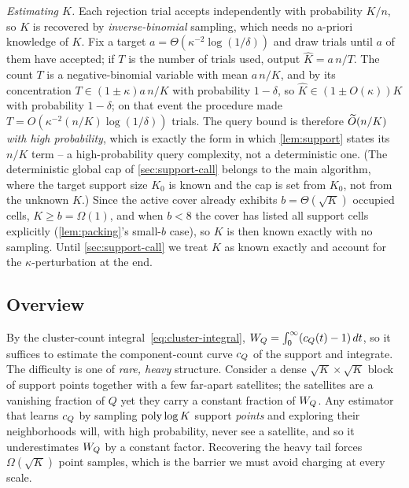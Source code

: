 \emph{Estimating $K$.} Each rejection trial accepts independently with probability $K/n$, so $K$ is
recovered by \emph{inverse-binomial} sampling, which needs no a-priori knowledge of $K$. Fix a target
$a=\Theta(\kappa^{-2}\log(1/\delta))$ and draw trials until $a$ of them have accepted; if $T$ is the number
of trials used, output $\widehat K=a\,n/T$. The count $T$ is a negative-binomial variable with mean
$a\,n/K$, and by its concentration $T\in(1\pm\kappa)a\,n/K$ with probability $1-\delta$, so $\widehat K\in
(1\pm O(\kappa))K$ with probability $1-\delta$; on that event the procedure made $T=O(\kappa^{-2}(n/K)
\log(1/\delta))$ trials. The query bound is therefore $\widetilde{O}(n/K)$ \emph{with high probability}, which is
exactly the form in which \cref{lem:support} states its $n/K$ term -- a high-probability query complexity,
not a deterministic one. (The deterministic global cap of \cref{sec:support-call} belongs to the main
algorithm, where the target support size $K_0$ is known and the cap is set from $K_0$, not from the unknown
$K$.) Since the active cover already exhibits $b=\Theta(\sqrt K)$ occupied cells, $K\ge b=\Omega(1)$, and
when $b<8$ the cover has listed all support cells explicitly (\cref{lem:packing}'s small-$b$ case), so $K$
is then known exactly with no sampling. Until \cref{sec:support-call} we treat $K$ as known exactly and
account for the $\kappa$-perturbation at the end.

\subsection{Overview}\label{sec:support-overview}

By the cluster-count integral~\eqref{eq:cluster-integral}, $W_Q=\int_0^\infty(c_Q(t)-1)\,dt$, so it
suffices to estimate the component-count curve $c_Q$ of the support and integrate. The difficulty is one
of \emph{rare, heavy} structure. Consider a dense $\sqrt K\times\sqrt K$ block of support points together
with a few far-apart satellites; the satellites are a vanishing fraction of $Q$ yet they carry a constant
fraction of $W_Q$. Any estimator that learns $c_Q$ by sampling $\operatorname{poly}\log K$ support \emph{points} and
exploring their neighborhoods will, with high probability, never see a satellite, and so it underestimates
$W_Q$ by a constant factor. Recovering the heavy tail forces $\Omega(\sqrt K)$ point samples, which is the
barrier we must avoid charging at every scale.

